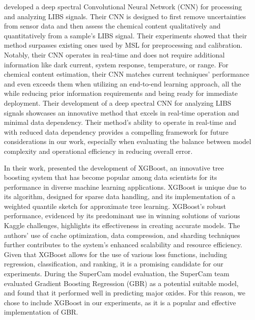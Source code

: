\citeauthor{castorena_deep_2021} developed a deep spectral Convolutional Neural Network (CNN) for processing and analyzing LIBS signals.
Their CNN is designed to first remove uncertainties from sensor data and then assess the chemical content qualitatively and quantitatively from a sample's LIBS signal.
Their experiments showed that their method surpasses existing ones used by MSL for preprocessing and calibration.
Notably, their CNN operates in real-time and does not require additional information like dark current, system response, temperature, or range.
For chemical content estimation, their CNN matches current techniques' performance and even exceeds them when utilizing an end-to-end learning approach, all the while reducing prior information requirements and being ready for immediate deployment\cite{castorena_deep_2021}.
Their development of a deep spectral CNN for analyzing LIBS signals showcases an innovative method that excels in real-time operation and minimal data dependency. Their method's ability to operate in real-time and with reduced data dependency provides a compelling framework for future considerations in our work, especially when evaluating the balance between model complexity and operational efficiency in reducing overall error.

In their work, \citeauthor{chen_xgboost_2016} presented the development of XGBoost, an innovative tree boosting system that has become popular among data scientists for its performance in diverse machine learning applications. 
XGBoost is unique due to its algorithm, designed for sparse data handling, and its implementation of a weighted quantile sketch for approximate tree learning.
XGBoost's robust performance, evidenced by its predominant use in winning solutions of various Kaggle challenges, highlights its effectiveness in creating accurate models.
The authors' use of cache optimization, data compression, and sharding techniques further contributes to the system's enhanced scalability and resource efficiency\cite{chen_xgboost_2016}.
Given that XGBoost allows for the use of various loss functions, including regression, classification, and ranking, it is a promising candidate for our experiments.
During the SuperCam model evaluation, the SuperCam team evaluated Gradient Boosting Regression (GBR) as a potential suitable model, and found that it performed well in predicting major oxides\cite{andersonPostlandingMajorElement2022}.
For this reason, we chose to include XGBoost in our experiments, as it is a popular and effective implementation of GBR.
